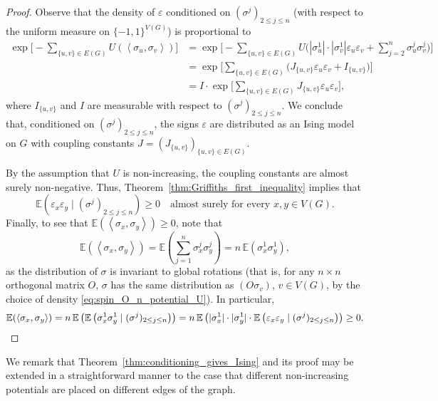 \documentclass[12pt,reqno]{article}
\def\E{\mathbb{E}}
\def\eps{\varepsilon}
\begin{document}
\begin{proof}
	Observe that the density of $\eps$ conditioned on
	$(\sigma^j)_{2\le j\le n}$ (with respect to the uniform measure on
	$\{-1,1\}^{V(G)}$) is proportional to
	\begin{align*}
	\exp \Bigg[-\sum_{\{u,v\}\in E(G)}U(\left\langle\sigma_u,\sigma_v\right\rangle)\Bigg]
	 &= \exp\Bigg[-\sum_{\{u,v\}\in E(G)}U\Bigg(|\sigma_u^1|\cdot |\sigma_v^1|
	\eps_u \eps_v + \sum_{j=2}^n\sigma_u^j \sigma_v^j\Bigg)\Bigg] \\
	 &= \exp\Bigg[\sum_{\{u,v\}\in E(G)} \big (J_{\{u,v\}} \eps_u \eps_v + I_{\{u,v\}} \big) \Bigg] \\
	 &= I \cdot \exp\Bigg[\sum_{\{u,v\}\in E(G)} J_{\{u,v\}} \eps_u \eps_v \Bigg] ,
	\end{align*}
	where $I_{\{u,v\}}$ and $I$ are measurable with respect to $(\sigma^j)_{2\le j\le n}$.
	We conclude that, conditioned on $(\sigma^j)_{2\le
		j\le n}$, the signs $\eps$ are distributed as an Ising model on $G$
	with coupling constants $J=(J_{\{u,v\}})_{\{u,v\} \in E(G)}$.

	By the assumption that $U$ is non-increasing, the coupling constants are almost surely non-negative. Thus, Theorem~\ref{thm:Griffiths_first_inequality} implies that
	\begin{equation*}
	\E\left(\eps_x \eps_y\; |\; (\sigma^j)_{2\le j\le n}\right)\ge
	0\quad\text{almost surely for every }x,y \in V(G).
	\end{equation*}
	Finally, to see that $\E(\left\langle\sigma_x,\sigma_y\right\rangle) \ge 0$, note that
	\begin{equation*}
	\E(\left\langle\sigma_x,\sigma_y\right\rangle) = \E\left(\sum_{j=1}^n\sigma_x^j \sigma_y^j\right) = n\,\E\left(\sigma_x^1 \sigma_y^1\right),
	\end{equation*}
	as the distribution of $\sigma$ is invariant to global rotations
	(that is, for any $n\times n$ orthogonal matrix $O$, $\sigma$ has
	the same distribution as $(O\sigma_v)$, $v\in V(G)$, by the choice
	of density \eqref{eq:spin_O_n_potential_U}). In particular,
	\[ \E(\left\langle\sigma_x,\sigma_y\right\rangle) =
	n\,\E\left(\E\left(\sigma_x^1 \sigma_y^1\; |\; (\sigma^j)_{2\le j\le n}\right)\right) =
	n\,\E\left(|\sigma_x^1|\cdot |\sigma_y^1|\cdot\E\left(\eps_x \eps_y\; |\; (\sigma^j)_{2\le j\le n}\right)\right) \ge 0 . \qedhere \]
\end{proof}


We remark that Theorem~\ref{thm:conditioning_gives_Ising}
and its proof may be extended in a straightforward manner to the
case that different non-increasing potentials are placed on
different edges of the graph.
\end{document}
